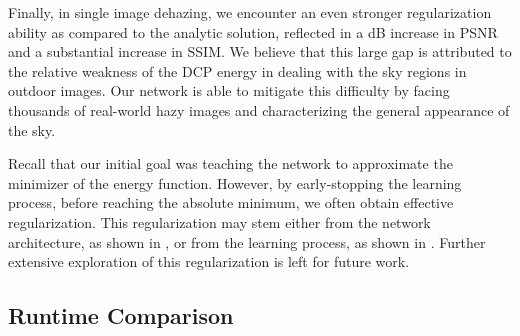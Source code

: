 \documentclass[journal]{IEEEtran}
\begin{document}
Finally, in single image dehazing, we encounter an even stronger regularization ability as compared to the analytic solution, reflected in a  dB increase in PSNR and a substantial increase in SSIM. We believe that this large gap is attributed to the relative weakness of the DCP energy in dealing with the sky regions in outdoor images. Our network is able to mitigate this difficulty by facing thousands of real-world hazy images and characterizing the general appearance of the sky.

Recall that our initial goal was teaching the network to approximate the minimizer of the energy function. However, by early-stopping the learning process, before reaching the absolute minimum, we often obtain effective regularization. This regularization may stem either from the network architecture, as shown in \cite{deep_image_prior}, or from the learning process, as shown in \cite{implicit_bias}. Further extensive exploration of this regularization is left for future work. 

\begin{table*}[t]
  \caption{Quantitative results of the \emph{Deep Energy} approach. Each cell describes (analytic/network) performance values, and the better is shown in Bold. In mIOU, SAD, PSNR and SSIM, higher is better, and in MSE lower is better.}
  \label{tbl:results}
  \centering
  \def\arraystretch{1.3}
\end{table*}



\subsection{Runtime Comparison} \label{ss:runtime}
\end{document}
